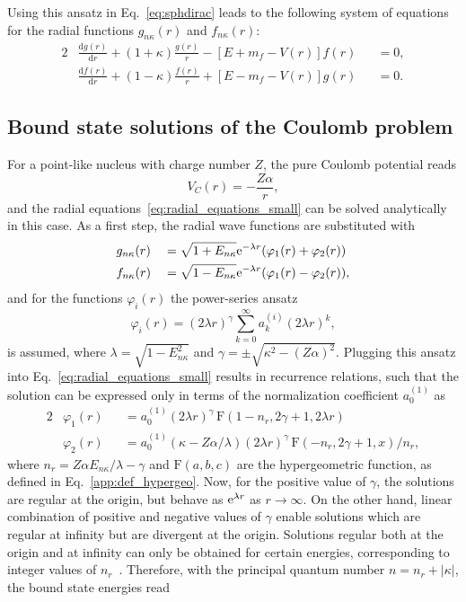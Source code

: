 Using this ansatz in Eq.~\eqref{eq:sphdirac} leads to the following system of equations for the radial functions $g_{n\kappa}(r)$ and $f_{n\kappa}(r)$:
\begin{alignat}{2}
& \frac{\mathrm{d}g(r)}{\mathrm{d}r}+(1+\kappa)\frac{g(r)}{r}
-\left[ E+m_f-V(r) \right] f(r) &&= 0,\\[7.5pt]
&\frac{\mathrm{d}f(r)}{\mathrm{d}r}+(1-\kappa)\frac{f(r)}{r}
+\left[ E-m_f-V(r) \right] g(r) &&= 0.
\label{eq:radial_equations_small}
\end{alignat}

\subsection{Bound state solutions of the Coulomb problem}
For a point-like nucleus with charge number $Z$, the pure Coulomb potential reads
\begin{equation}
\label{eq:pureCoulomb}
V_C(r)=-\frac{Z\alpha}{r},
\end{equation}
and the radial equations~\eqref{eq:radial_equations_small} can be solved analytically in this case. As a first step, the radial wave functions are substituted with
\begin{alignat}{2}
&g_{n\kappa}(r)&&= \sqrt{1+E_{n\kappa}}\text{e}^{-\lambda r}(\varphi_1(r)+\varphi_2(r)) \\
&f_{n\kappa}(r)&&=\sqrt{1-E_{n\kappa}}\text{e}^{-\lambda r}(\varphi_1(r)-\varphi_2(r)),
\end{alignat}
and for the functions $\varphi_i(r)$ the power-series ansatz
\begin{equation}
\varphi_i(r)=(2\lambda r)^\gamma \sum_{k=0}^\infty a^{(i)}_k (2\lambda r)^k,
\end{equation}
is assumed, where $\lambda = \sqrt{1-E^2_{n\kappa}}$ and $\gamma=\pm \sqrt{\kappa^2 - (Z\alpha)^2}$. Plugging this ansatz into Eq.~\eqref{eq:radial_equations_small} results in recurrence relations, such that the solution can be expressed only in terms of the normalization coefficient $a^{(1)}_0$ as
\begin{alignat}{2}
& \varphi_1(r)&&=a^{(1)}_0 (2\lambda r)^\gamma\, \text{F}(1-n_r,2\gamma+1,2\lambda r)\\
& \varphi_2(r) &&= a^{(1)}_0 (\kappa -Z\alpha / \lambda) (2\lambda r)^\gamma\, \text{F}(-n_r,2\gamma+1,x) /n_r,
\end{alignat}
where $n_r=Z\alpha E_{n\kappa}/\lambda - \gamma$ and $\text{F}(a,b,c)$ are the hypergeometric function, as defined in Eq.~\eqref{app:def_hypergeo}. Now, for the positive value of $\gamma$, the solutions are regular at the origin, but behave as $\text{e}^{\lambda r}$ as $r\rightarrow \infty$. On the other hand, linear combination of positive and negative values of $\gamma$ enable solutions which are regular at infinity but are divergent at the origin. Solutions regular both at the origin and at infinity can only be obtained for certain energies, corresponding to integer values of $n_r$~\cite{rose1961}. Therefore, with the principal quantum number $n=n_r+|\kappa|$, the bound state energies read
